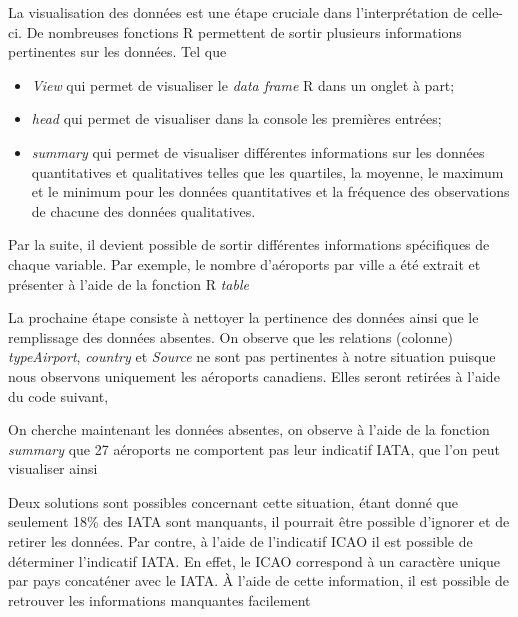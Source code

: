 \documentclass{report}
\begin{document}
La visualisation des données est une étape cruciale dans l’interprétation de celle-ci. De nombreuses fonctions R permettent de sortir plusieurs informations pertinentes sur les données. Tel que
\begin{itemize}
\item \textit{View}\cite{Rfunction:View} qui permet de visualiser le \emph{data frame} R dans un onglet à part;
\item \textit{head} \cite{Rfunction:head} qui permet de visualiser dans la console les premières entrées;
\item \textit{summary}\cite{Rfunction:summary} qui permet de visualiser différentes informations sur les données quantitatives et qualitatives telles que les quartiles, la moyenne, le maximum et le minimum pour les données quantitatives  et la fréquence des observations de chacune des données qualitatives.
\end{itemize}
Par la suite, il devient possible de sortir différentes informations spécifiques de chaque variable. Par exemple, le nombre d'aéroports par ville a été extrait et présenter à l'aide de la fonction R \textit{table} \cite{Rfunction:table}
%
%


La prochaine étape consiste à nettoyer la pertinence des données ainsi que le remplissage des données absentes. On observe que les relations (colonne) \textit{typeAirport}, \textit{country} et \textit{Source} ne sont pas pertinentes à notre situation puisque nous observons uniquement les aéroports canadiens. Elles seront retirées à l'aide du code suivant,

%
%

On cherche maintenant les données absentes, on observe à l'aide de la fonction \emph{summary} que 27 aéroports ne comportent pas leur indicatif IATA, que l'on peut visualiser ainsi

%
%

Deux solutions sont possibles concernant cette situation, étant donné que seulement 18\% des IATA sont manquants, il pourrait être possible d'ignorer et de retirer les données. Par contre, à l'aide de l'indicatif ICAO il est possible de déterminer l'indicatif IATA. En effet, le ICAO correspond à un caractère unique par pays concaténer avec le IATA. À l'aide de cette information, il est possible de retrouver les informations manquantes facilement 
\end{document}
